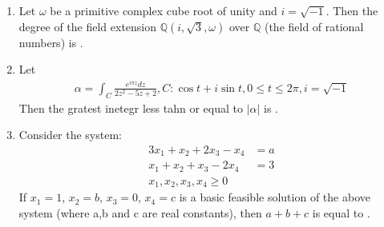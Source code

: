 \documentclass[journal]{IEEEtran}
\begin{document}
\begin{enumerate}
\vspace{0.5cm}
\item Let \( \omega \) be a primitive complex cube root of unity and \( i = \sqrt{-1} \). Then the degree of the field extension \( \mathbb{Q} \left( i, \sqrt{3}, \omega \right) \) over \( \mathbb{Q} \) (the field of rational numbers) is \underline{\hspace{1cm}}.

\vspace{0.5cm}

\item Let 
\begin{align*}
    \alpha =\int_{C}\frac{e^{i\pi z}dz}{2z^2-5z+2}, C:\cos{t}+i\sin{t}, 0\leq t \leq 2\pi,i=\sqrt{-1}
\end{align*}
Then the gratest inetegr less tahn or equal to $|\alpha|$ is \underline{\hspace{1cm}}.
\vspace{0.5cm}
\item Consider the system:
\begin{align*}
    3x_1+x_2+2x_3-x_4&=a\\
    x_1+x_2+x_3-2x_4&=3\\
    x_1,x_2,x_3,x_4\geq 0
\end{align*}
If $x_1=1$, $x_2=b$, $x_3=0$, $x_4=c$ is a basic feasible solution of the above system (where a,b and c are real constants), then $a+b+c$ is equal to \underline{\hspace{1cm}}.
\vspace{0.5cm}


\end{enumerate}
\end{document}
